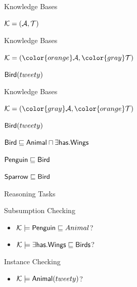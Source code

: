\documentclass[10pt]{beamer}
\begin{document}
%
%

\begin{frame}[fragile]{Knowledge Bases}
  \begin{center}
    \Large{
      $\mathcal{K} = (\mathcal{A}, \mathcal{T})$
    } 
  \end{center}
\end{frame}


\begin{frame}[fragile]{Knowledge Bases}
  \begin{center}
    \Large{
      $\Kmc = ({\color{orange} \Amc}, {\color{gray}\Tmc})$
    }
  \end{center}

    \vspace{2mm}

    \Large{ \color{orange}
    $\mathsf{Bird}({tweety})$
    }
\end{frame}


\begin{frame}[fragile]{Knowledge Bases}
  \begin{center}

    \Large{
      $\Kmc = ({\color{gray}\Amc}, {\color{orange}\Tmc})$
    }
  \end{center}

    \vspace{2mm}

    {\color{gray}
    $\mathsf{Bird}({tweety})$
    }

    \Large{ 
    {\color{orange}$\mathsf{Bird} \sqsubseteq \mathsf{Animal} \sqcap \exists \mathsf{has}.\mathsf{Wings}$

    $\mathsf{Penguin} \sqsubseteq \mathsf{Bird}$
    
    $\mathsf{Sparrow} \sqsubseteq \mathsf{Bird}$}
    }

\end{frame}


\begin{frame}[fragile]{Reasoning Tasks}

  {\large
  \begin{center}
    \Large{Subsumption Checking}  
  \end{center}

    \begin{itemize}
      \item $\mathcal{K} \models \mathsf{Penguin} \sqsubseteq Animal$?
      \item $\mathcal{K} \models \exists \mathsf{has}.\mathsf{Wings} \sqsubseteq \mathsf{Birds}$?
    \end{itemize}

    \pause 

    \begin{center}
      \Large{Instance Checking}  
    \end{center}

    \begin{itemize}
      \item $\mathcal{K} \models \mathsf{Animal}(tweety)$?
    \end{itemize}
  }
\end{frame}
\end{document}
